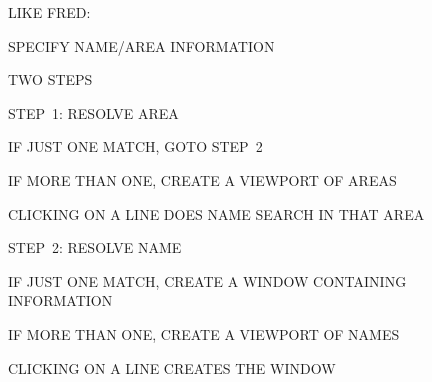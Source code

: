 \begin{bwslide}

\begin{nrtc}
\item	LIKE FRED:
    \begin{nrtc}
    \item	SPECIFY NAME/AREA INFORMATION

    \item	TWO STEPS
    \end{nrtc}

\item	STEP~1: RESOLVE AREA
    \begin{nrtc}
    \item	IF JUST ONE MATCH, GOTO STEP~2

    \item	IF MORE THAN ONE, CREATE A VIEWPORT OF AREAS
	\begin{nrtc}
	\item	CLICKING ON A LINE DOES NAME SEARCH IN THAT AREA
	\end{nrtc}
    \end{nrtc}

\item	STEP~2: RESOLVE NAME
    \begin{nrtc}
    \item	IF JUST ONE MATCH, CREATE A WINDOW CONTAINING INFORMATION

    \item	IF MORE THAN ONE, CREATE A VIEWPORT OF NAMES
	\begin{nrtc}
	\item	CLICKING ON A LINE CREATES THE WINDOW
	\end{nrtc}
    \end{nrtc}
\end{nrtc}
\end{bwslide}








